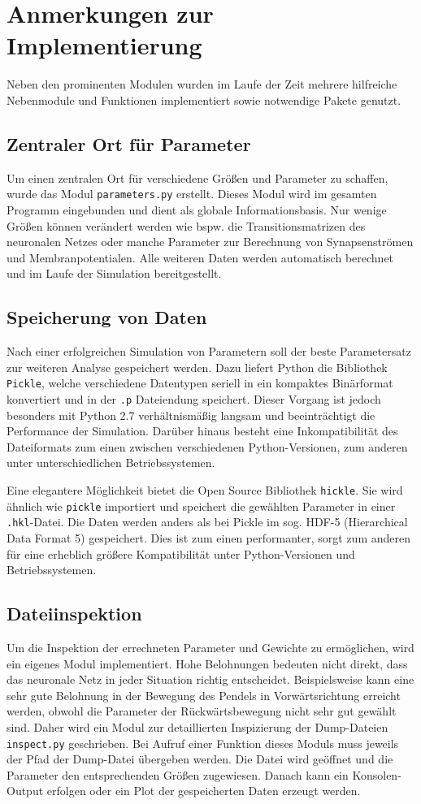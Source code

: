 \section{Anmerkungen zur Implementierung}
\label{sec:imp_sonst}
	Neben den prominenten Modulen wurden im Laufe der Zeit mehrere hilfreiche Nebenmodule und Funktionen implementiert sowie notwendige Pakete genutzt.
	\subsection{Zentraler Ort für Parameter}
		Um einen zentralen Ort für verschiedene Größen und Parameter zu schaffen, wurde das Modul \texttt{parameters.py} erstellt. Dieses Modul wird im gesamten Programm eingebunden und dient als globale Informationsbasis. Nur wenige Größen können verändert werden wie bspw. die Transitionsmatrizen des neuronalen Netzes oder manche Parameter zur Berechnung von Synapsenströmen und Membranpotentialen. Alle weiteren Daten werden automatisch berechnet und im Laufe der Simulation bereitgestellt.
	\subsection{Speicherung von Daten}
		Nach einer erfolgreichen Simulation von Parametern soll der beste Parametersatz zur weiteren Analyse gespeichert werden. Dazu liefert Python die Bibliothek \texttt{Pickle}, welche verschiedene Datentypen seriell in ein kompaktes Binärformat konvertiert und in der \texttt{.p} Dateiendung speichert. Dieser Vorgang ist jedoch besonders mit Python 2.7 verhältnismäßig langsam und beeinträchtigt die Performance der Simulation. Darüber hinaus besteht eine Inkompatibilität des Dateiformats zum einen zwischen verschiedenen Python-Versionen, zum anderen unter unterschiedlichen Betriebssystemen.
		
		Eine elegantere Möglichkeit bietet die Open Source Bibliothek \texttt{hickle}. Sie wird ähnlich wie \texttt{pickle} importiert und speichert die gewählten Parameter in einer \texttt{.hkl}-Datei. Die Daten werden anders als bei Pickle im sog. HDF-5 (Hierarchical Data Format 5) \cite{hdf5} gespeichert. Dies ist zum einen performanter, sorgt zum anderen für eine erheblich größere Kompatibilität unter Python-Versionen und Betriebssystemen.
	\subsection{Dateiinspektion}
		Um die Inspektion der errechneten Parameter und Gewichte zu ermöglichen, wird ein eigenes Modul implementiert. Hohe Belohnungen bedeuten nicht direkt, dass das neuronale Netz in jeder Situation richtig entscheidet. Beispielsweise kann eine sehr gute Belohnung in der Bewegung des Pendels in Vorwärtsrichtung erreicht werden, obwohl die Parameter der Rückwärtsbewegung nicht sehr gut gewählt sind. Daher wird ein Modul zur detaillierten Inspizierung der Dump-Dateien \texttt{inspect.py} geschrieben. Bei Aufruf einer Funktion dieses Moduls muss jeweils der Pfad der Dump-Datei übergeben werden. Die Datei wird geöffnet und die Parameter den entsprechenden Größen zugewiesen. Danach kann ein Konsolen-Output erfolgen oder ein Plot der gespeicherten Daten erzeugt werden.



